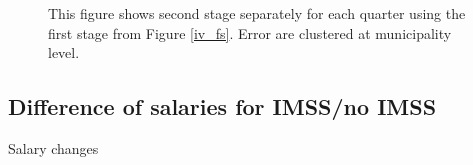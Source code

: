 \begin{figure}[H]
\begin{center}
\begin{subfigure}{0.325\textwidth}
    \end{subfigure}  
  \end{center}
  \vspace{-.15in}
    \scriptsize 
   This figure shows second stage separately for each quarter using the first stage from Figure \ref{iv_fs}. Error are clustered at municipality level.
    
\end{figure}

\vspace{2in}



\subsection{Difference of salaries for IMSS/no IMSS}

\begin{table}[H]
\caption{Salary changes}
\label{salary_changes}
\begin{center}
\resizebox{0.40\textwidth}{!}{
\scriptsize{}
}
\end{center}
\scriptsize 
\end{table}


\newpage 


